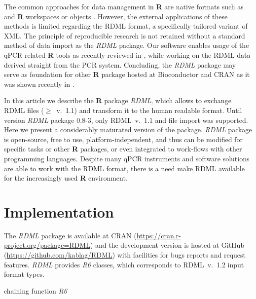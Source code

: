 \documentclass{bioinfo}
\begin{document}
The common approaches for data management in \textbf{R} are native formats such 
as and \textbf{R} workspaces or objects \cite{roediger_rkward_2012}. However, 
the external applications of these methods is limited regarding the RDML format, 
a specifically tailored variant of XML. The principle of reproducible research 
is not retained without a standard method of data import as the \textit{RDML} 
package. Our software enables usage of the qPCR-related \textbf{R} tools as 
recently reviewed in \cite{pabinger_2014}, while working on the RDML data 
derived straight from the PCR system. Concluding, the \textit{RDML} package may 
serve as foundation for other \textbf{R} package hosted at Bioconductor 
\cite{gentleman_2004} and CRAN as it was shown recently in \cite{roediger2015r}.

In this article we describe the \textbf{R} package \textit{RDML}, which 
allows to exchange RDML files ($\geq$~v.~1.1) and transform it to the human 
readable format. Until version \textit{RDML} package 0.8-3, only RDML~v.~1.1 and 
file import was supported. Here we present a considerably maturated version of 
the package. \textit{RDML} package is open-source, free to use, 
platform-independent, and thus can be modified for specific tasks or other 
\textbf{R} packages, or even integrated to work-flows with other programming 
languages. Despite many qPCR instruments and software solutions are able 
to work with the RDML format, there is a need make RDML available for the increasingly 
used \textbf{R} environment.

\section{Implementation}
	
The \textit{RDML} package is available at CRAN 
(\url{https://cran.r-project.org/package=RDML}) and the 
development version is hosted at GitHub (\url{https://github.com/kablag/RDML}) 
with facilities for bugs reports and request features. \textit{RDML} provides 
\emph{R6} classes, which corresponds to RDML~v.~1.2 input format types. 


chaining function \emph{R6}
\end{document}

